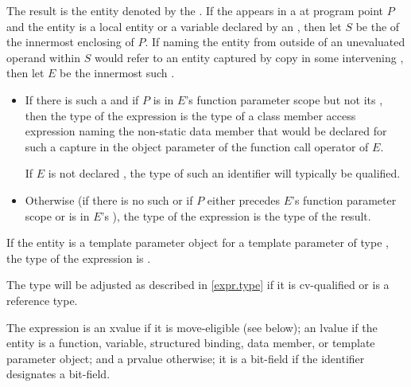 \pnum
The result is the entity denoted by
the .
If the  appears
in a  at program point $P$ and
the entity is a local entity or a variable declared by
an ,
then let $S$ be the  of
the innermost enclosing  of $P$.
If naming the entity from outside of an unevaluated operand within $S$
would refer to an entity
captured by copy in some intervening ,
then let $E$ be the innermost such .
\begin{itemize}
\item
If there is such a  and
if $P$ is in $E$'s function parameter scope
but not its , then
the type of the expression is
the type of a class member access expression
naming the non-static data member
that would be declared for such a capture
in the object parameter of the function call operator of $E$.
\begin{note}
If $E$ is not declared ,
the type of such an identifier will typically be  qualified.
\end{note}
\item
Otherwise (if there is no such  or
if $P$ either precedes $E$'s function parameter scope or
is in $E$'s ),
the type of the expression is the type of the result.
\end{itemize}
\begin{note}
If the entity is a template parameter object for
a template parameter of type ,
the type of the expression is .
\end{note}
\begin{note}
The type will be adjusted as described in \ref{expr.type}
if it is cv-qualified or is a reference type.
\end{note}
The expression is an xvalue if it is move-eligible (see below);
an lvalue
if the entity is a function, variable, structured binding, data member, or
template parameter object;
and a prvalue otherwise;
it is a bit-field if the identifier designates a bit-field.

